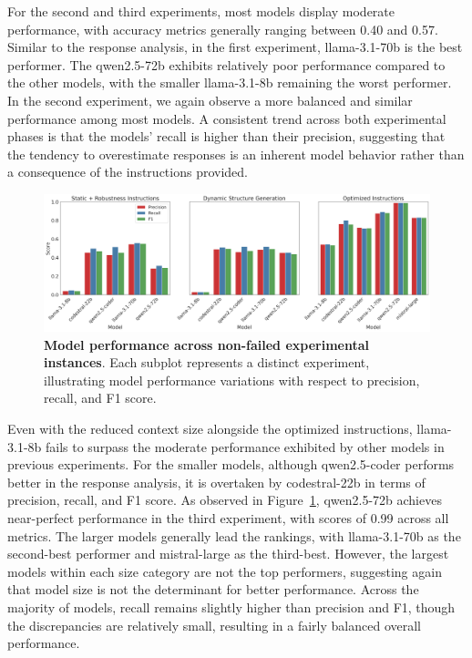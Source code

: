 \documentclass{DESSThesis}
\begin{document}
\noindent For the second and third experiments, most models display moderate performance, with accuracy metrics generally ranging between 0.40 and 0.57. Similar to the response analysis, in the first experiment, llama-3.1-70b is the best performer. The qwen2.5-72b exhibits relatively poor performance compared to the other models, with the smaller llama-3.1-8b remaining the worst performer. In the second experiment, we again observe a more balanced and similar performance among most models. A consistent trend across both experimental phases is that the models' recall is higher than their precision, suggesting that the tendency to overestimate responses is an inherent model behavior rather than a consequence of the instructions provided.

\begin{figure}[ht]
    \centering
    \includegraphics[width=\linewidth]{img/Results/Second Experimental Phase/Evaluation of Model Performance Across Experiments.png}
    \caption[Model performance across non-failed experimental instances]{\textbf{Model performance across non-failed experimental instances}. Each subplot represents a distinct experiment, illustrating model performance variations with respect to precision, recall, and F1 score.}
    \label{fig:model_performance_nonfailed_second}
\end{figure}

Even with the reduced context size alongside the optimized instructions, llama-3.1-8b fails to surpass the moderate performance exhibited by other models in previous experiments. For the smaller models, although qwen2.5-coder performs better in the response analysis, it is overtaken by codestral-22b in terms of precision, recall, and F1 score. As observed in Figure~\ref{fig:model_performance_nonfailed_second}, qwen2.5-72b achieves near-perfect performance in the third experiment, with scores of 0.99 across all metrics. The larger models generally lead the rankings, with llama-3.1-70b as the second-best performer and mistral-large as the third-best. However, the largest models within each size category are not the top performers, suggesting again that model size is not the determinant for better performance. Across the majority of models, recall remains slightly higher than precision and F1, though the discrepancies are relatively small, resulting in a fairly balanced overall performance.
\end{document}
